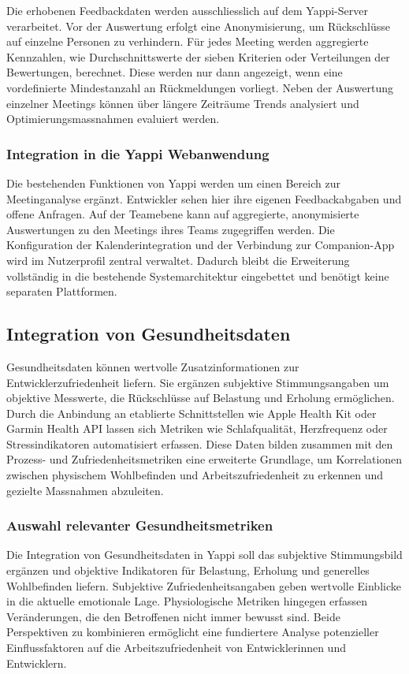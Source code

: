 \documentclass[12pt,a4paper]{report}
\begin{document}
Die erhobenen Feedbackdaten werden ausschliesslich auf dem Yappi-Server verarbeitet.
Vor der Auswertung erfolgt eine Anonymisierung, um Rückschlüsse auf einzelne Personen zu verhindern.
Für jedes Meeting werden aggregierte Kennzahlen, wie Durchschnittswerte der sieben Kriterien oder Verteilungen der Bewertungen, berechnet.
Diese werden nur dann angezeigt, wenn eine vordefinierte Mindestanzahl an Rückmeldungen vorliegt.
Neben der Auswertung einzelner Meetings können über längere Zeiträume Trends analysiert und Optimierungsmassnahmen evaluiert werden.

\subsubsection{Integration in die Yappi Webanwendung}

Die bestehenden Funktionen von Yappi werden um einen Bereich zur Meetinganalyse ergänzt.
Entwickler sehen hier ihre eigenen Feedbackabgaben und offene Anfragen.
Auf der Teamebene kann auf aggregierte, anonymisierte Auswertungen zu den Meetings ihres Teams zugegriffen werden.
Die Konfiguration der Kalenderintegration und der Verbindung zur Companion-App wird im Nutzerprofil zentral verwaltet.
Dadurch bleibt die Erweiterung vollständig in die bestehende Systemarchitektur eingebettet und benötigt keine separaten Plattformen.

\subsection{Integration von Gesundheitsdaten}

Gesundheitsdaten können wertvolle Zusatzinformationen zur Entwicklerzufriedenheit liefern. Sie ergänzen subjektive Stimmungsangaben
um objektive Messwerte, die Rückschlüsse auf Belastung und Erholung ermöglichen. Durch die Anbindung an etablierte Schnittstellen
wie Apple Health Kit oder Garmin Health API lassen sich Metriken wie Schlafqualität, Herzfrequenz oder Stressindikatoren 
automatisiert erfassen. Diese Daten bilden zusammen mit den Prozess- und Zufriedenheitsmetriken eine erweiterte Grundlage, um
Korrelationen zwischen physischem Wohlbefinden und Arbeitszufriedenheit zu erkennen und gezielte Massnahmen abzuleiten.

\subsubsection{Auswahl relevanter Gesundheitsmetriken}

Die Integration von Gesundheitsdaten in Yappi soll das subjektive Stimmungsbild ergänzen und objektive Indikatoren für Belastung,
Erholung und generelles Wohlbefinden liefern. Subjektive Zufriedenheitsangaben geben wertvolle Einblicke in die aktuelle emotionale
Lage. Physiologische Metriken hingegen erfassen Veränderungen, die den Betroffenen nicht immer bewusst sind. Beide Perspektiven zu
kombinieren ermöglicht eine fundiertere Analyse potenzieller Einflussfaktoren auf die Arbeitszufriedenheit von Entwicklerinnen und
Entwicklern.
\end{document}
